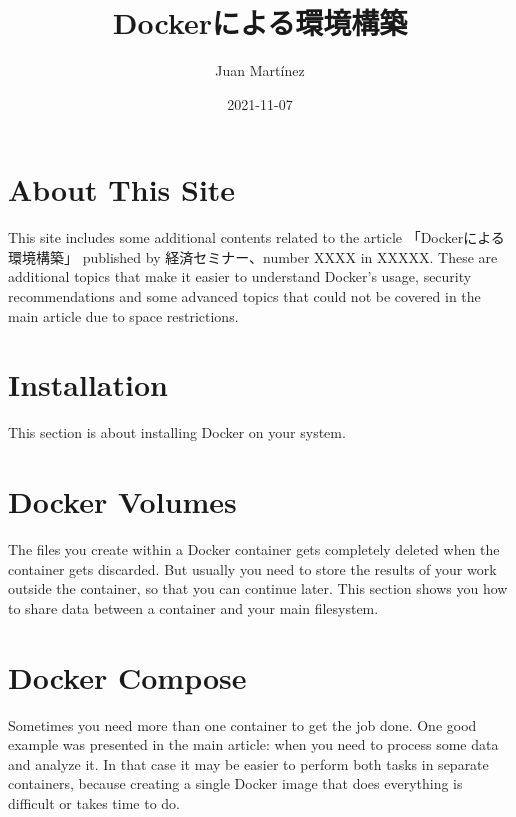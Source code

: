 \documentclass[]{book}
\title{Dockerによる環境構築}
\author{Juan Martínez}
\date{2021-11-07}
\begin{document}
\maketitle

{
\setcounter{tocdepth}{1}
\tableofcontents
}
\hypertarget{about-this-site}{%
\chapter*{About This Site}\label{about-this-site}}

This site includes some additional contents related to the article 「Dockerによる環境構築」 published by 経済セミナー、number XXXX in XXXXX. These are additional topics that make it easier to understand Docker's usage, security recommendations and some advanced topics that could not be covered in the main article due to space restrictions.

\hypertarget{installation}{%
\chapter{Installation}\label{installation}}

This section is about installing Docker on your system.

\hypertarget{docker-volumes}{%
\chapter{Docker Volumes}\label{docker-volumes}}

The files you create within a Docker container gets completely deleted when the container gets discarded. But usually you need to store the results of your work outside the container, so that you can continue later. This section shows you how to share data between a container and your main filesystem.

\hypertarget{docker-compose}{%
\chapter{Docker Compose}\label{docker-compose}}

Sometimes you need more than one container to get the job done. One good example was presented in the main article: when you need to process some data and analyze it. In that case it may be easier to perform both tasks in separate containers, because creating a single Docker image that does everything is difficult or takes time to do.
\end{document}
